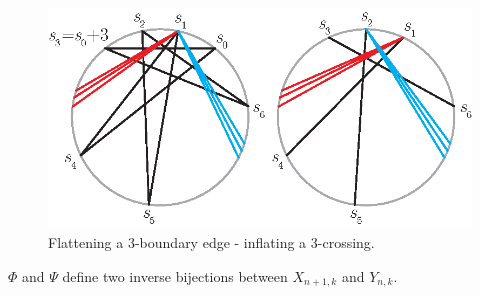 \documentclass[12pt]{amsart}
\begin{document}
\begin{figure}
\centerline{\includegraphics[scale=1]{flatinfl.eps}}
\caption{\small{Flattening a $3$-boundary edge - inflating a $3$-crossing.}}\label{flatinfl}
\end{figure}

\begin{theorem}\label{flattening/inflating}
$\Phi$ and $\Psi$ define two inverse bijections between $X_{n+1,k}$ and $Y_{n,k}$.
\end{theorem}
\end{document}
